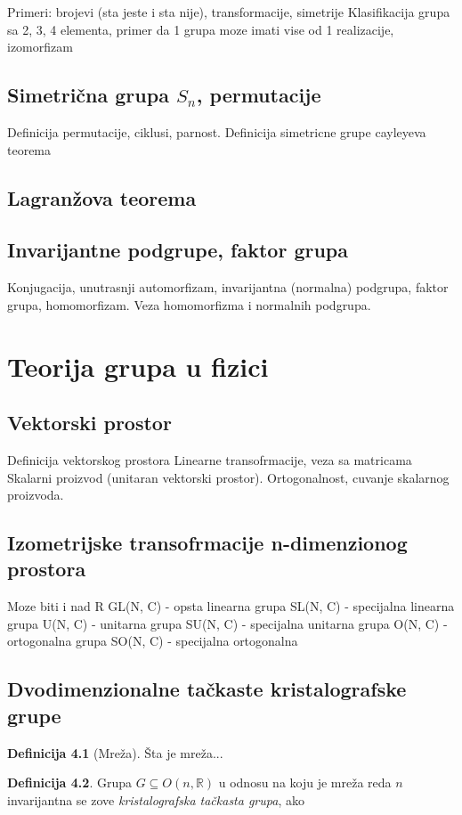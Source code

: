 \documentclass[times, utf8, diplomski]{fer}
\theoremstyle{plain}
\theoremstyle{definition}
\newtheorem{defn}{Definicija}
\begin{document}
Primeri: brojevi (sta jeste i sta nije), transformacije, simetrije
Klasifikacija grupa sa 2, 3, 4 elementa, primer da 1 grupa moze imati vise od 1 realizacije, izomorfizam
\section{Simetri\v{c}na grupa $S_n$, permutacije}
Definicija permutacije, ciklusi, parnost.
Definicija simetricne grupe
cayleyeva teorema
\section{Lagran\v{z}ova teorema}
\section{Invarijantne podgrupe, faktor grupa}
Konjugacija, unutrasnji automorfizam, invarijantna (normalna) podgrupa, faktor grupa, homomorfizam.
Veza homomorfizma i normalnih podgrupa.

\chapter{Teorija grupa u fizici}
\section{Vektorski prostor}
Definicija vektorskog prostora
Linearne transofrmacije, veza sa matricama
Skalarni proizvod (unitaran vektorski prostor).
Ortogonalnost, cuvanje skalarnog proizvoda.
\section{Izometrijske transofrmacije n-dimenzionog prostora}
Moze biti i nad R
GL(N, C) - opsta linearna grupa
SL(N, C) - specijalna linearna grupa
U(N, C) - unitarna grupa
SU(N, C) - specijalna unitarna grupa
O(N, C) - ortogonalna grupa
SO(N, C) - specijalna ortogonalna
\section{Dvodimenzionalne ta\v{c}kaste kristalografske grupe}
\begin{defn}[Mre\v za]
\v Sta je mre\v za...
\end{defn}
\begin{defn}
Grupa $G\subseteq O(n, \mathbb{R})$ u odnosu na koju je mre\v za reda $n$ invarijantna se zove \emph{kristalografska ta\v ckasta grupa}, ako
\end{defn}
\end{document}
